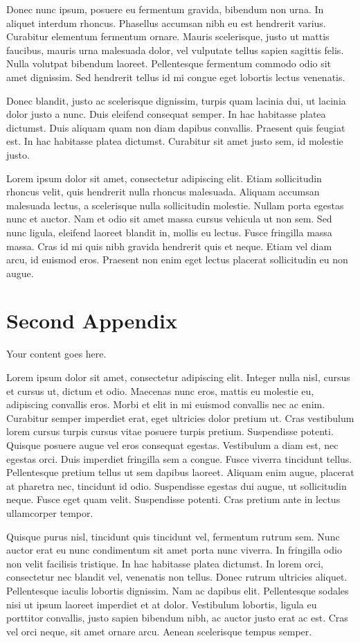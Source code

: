 \documentclass[12pt,lot,lof]{quthesis}
\begin{document}
\begin{appendices}
Donec nunc ipsum, posuere eu fermentum gravida, bibendum non urna. In aliquet interdum rhoncus. Phasellus accumsan nibh eu est hendrerit varius. Curabitur elementum fermentum ornare. Mauris scelerisque, justo ut mattis faucibus, mauris urna malesuada dolor, vel vulputate tellus sapien sagittis felis. Nulla volutpat bibendum laoreet. Pellentesque fermentum commodo odio sit amet dignissim. Sed hendrerit tellus id mi congue eget lobortis lectus venenatis.

Donec blandit, justo ac scelerisque dignissim, turpis quam lacinia dui, ut lacinia dolor justo a nunc. Duis eleifend consequat semper. In hac habitasse platea dictumst. Duis aliquam quam non diam dapibus convallis. Praesent quis feugiat est. In hac habitasse platea dictumst. Curabitur sit amet justo sem, id molestie justo.

Lorem ipsum dolor sit amet, consectetur adipiscing elit. Etiam sollicitudin rhoncus velit, quis hendrerit nulla rhoncus malesuada. Aliquam accumsan malesuada lectus, a scelerisque nulla sollicitudin molestie. Nullam porta egestas nunc et auctor. Nam et odio sit amet massa cursus vehicula ut non sem. Sed nunc ligula, eleifend laoreet blandit in, mollis eu lectus. Fusce fringilla massa massa. Cras id mi quis nibh gravida hendrerit quis et neque. Etiam vel diam arcu, id euismod eros. Praesent non enim eget lectus placerat sollicitudin eu non augue.

\chapter{Second Appendix}
Your content goes here.

Lorem ipsum dolor sit amet, consectetur adipiscing elit. Integer nulla nisl, cursus et cursus ut, dictum et odio. Maecenas nunc eros, mattis eu molestie eu, adipiscing convallis eros. Morbi et elit in mi euismod convallis nec ac enim. Curabitur semper imperdiet erat, eget ultricies dolor pretium ut. Cras vestibulum lorem cursus turpis cursus vitae posuere turpis pretium. Suspendisse potenti. Quisque posuere augue vel eros consequat egestas. Vestibulum a diam est, nec egestas orci. Duis imperdiet fringilla sem a congue. Fusce viverra tincidunt tellus. Pellentesque pretium tellus ut sem dapibus laoreet. Aliquam enim augue, placerat at pharetra nec, tincidunt id odio. Suspendisse egestas dui augue, ut sollicitudin neque. Fusce eget quam velit. Suspendisse potenti. Cras pretium ante in lectus ullamcorper tempor.

Quisque purus nisl, tincidunt quis tincidunt vel, fermentum rutrum sem. Nunc auctor erat eu nunc condimentum sit amet porta nunc viverra. In fringilla odio non velit facilisis tristique. In hac habitasse platea dictumst. In lorem orci, consectetur nec blandit vel, venenatis non tellus. Donec rutrum ultricies aliquet. Pellentesque iaculis lobortis dignissim. Nam ac dapibus elit. Pellentesque sodales nisi ut ipsum laoreet imperdiet et at dolor. Vestibulum lobortis, ligula eu porttitor convallis, justo sapien bibendum nibh, ac auctor justo erat ac est. Cras vel orci neque, sit amet ornare arcu. Aenean scelerisque tempus semper.


\end{appendices}
\end{document}
